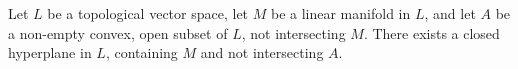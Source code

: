 Let $L$ be a topological vector space, let $M$ be a linear manifold in $L$, and let $A$ be a non-empty convex, open subset of $L$, not intersecting $M$. There exists a closed hyperplane in $L$, containing $M$ and not intersecting $A$.
